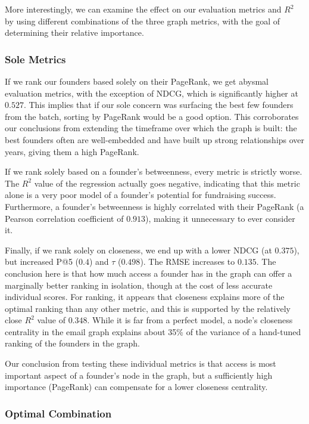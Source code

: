 More interestingly, we can examine the effect on our evaluation metrics and $R^2$ by using different combinations of the three graph metrics, with the goal of determining their relative importance.

\subsubsection{Sole Metrics}

If we rank our founders based solely on their PageRank, we get abysmal evaluation metrics, with the exception of NDCG, which is significantly higher at $0.527$. This implies that if our sole concern was surfacing the best few founders from the batch, sorting by PageRank would be a good option. This corroborates our conclusions from extending the timeframe over which the graph is built: the best founders often are well-embedded and have built up strong relationships over years, giving them a high PageRank.

If we rank solely based on a founder's betweenness, every metric is strictly worse. The $R^2$ value of the regression actually goes negative, indicating that this metric alone is a very poor model of a founder's potential for fundraising success. Furthermore, a founder's betweenness is highly correlated with their PageRank (a Pearson correlation coefficient of $0.913$), making it unnecessary to ever consider it.

Finally, if we rank solely on closeness, we end up with a lower NDCG (at $0.375$), but increased P@5 ($0.4$) and $\tau$ ($0.498$). The RMSE increases to $0.135$. The conclusion here is that how much access a founder has in the graph can offer a marginally better ranking in isolation, though at the cost of less accurate individual scores. For ranking, it appears that closeness explains more of the optimal ranking than any other metric, and this is supported by the relatively close $R^2$ value of $0.348$. While it is far from a perfect model, a node's closeness centrality in the email graph explains about 35\% of the variance of a hand-tuned ranking of the founders in the graph.

Our conclusion from testing these individual metrics is that access is most important aspect of a founder's node in the graph, but a sufficiently high importance (PageRank) can compensate for a lower closeness centrality.

\subsubsection{Optimal Combination}

